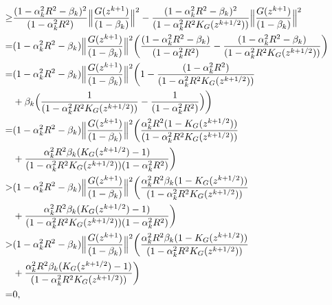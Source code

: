 \documentclass[10pt,a4paper]{amsart}
\begin{document}
\begin{align}
        \geq & \frac{(1 - \alpha_{k}^{2}R^{2} - \beta_{k})^{2}}{(1 - \alpha_{k}^{2}R^{2})}\Big{\|}\frac{G(z^{k+1})}{(1 - \beta_{k})}\Big{\|}^{2} - \frac{(1 - \alpha_{k}^{2}R^{2} - \beta_{k})^{2}}{(1 - \alpha_{k}^{2}R^{2}K_{G}(z^{k+1/2}))}\Big{\|} \frac{G(z^{k+1})}{(1 - \beta_{k})} \Big{\|}^{2} \label{app_of_YE} \\
        =& (1 - \alpha_{k}^{2}R^{2} - \beta_{k})\Big{\|} \frac{G(z^{k+1})}{(1 - \beta_{k})} \Big{\|}^{2}\bigg{(} \frac{(1 - \alpha_{k}^{2}R^{2} - \beta_{k})}{(1 - \alpha_{k}^{2}R^{2})} - \frac{(1 - \alpha_{k}^{2}R^{2} - \beta_{k})}{(1 - \alpha_{k}^{2}R^{2}K_{G}(z^{k+1/2}))} \bigg{)}\label{back_to_funny_alpha_lemma} \\
        =& (1 - \alpha_{k}^{2}R^{2} - \beta_{k})\Big{\|} \frac{G(z^{k+1})}{(1 - \beta_{k})} \Big{\|}^{2} \bigg{(} 1 - \frac{(1 - \alpha_{k}^{2}R^{2})}{(1 - \alpha_{k}^{2}R^{2}K_{G}(z^{k+1/2}))} \notag\\
        &+ \beta_{k} \Big{(}\frac{1}{(1 - \alpha_{k}^{2}R^{2}K_{G}(z^{k+1/2}))} - \frac{1}{(1 - \alpha_{k}^{2}R^{2})} \Big{)}\bigg{)} \notag \\
        =& (1 - \alpha_{k}^{2}R^{2} - \beta_{k})\Big{\|} \frac{G(z^{k+1})}{(1 - \beta_{k})} \Big{\|}^{2} \bigg{(} \frac{\alpha_{k}^{2}R^{2}(1 - K_{G}(z^{k+1/2}))}{(1 - \alpha_{k}^{2}R^{2}K_{G}(z^{k+1/2}))} \notag \\
        &+ \frac{\alpha_{k}^{2}R^{2}\beta_{k}(K_{G}(z^{k+1/2}) - 1)}{(1 - \alpha_{k}^{2}R^{2}K_{G}(z^{k+1/2}))(1 - \alpha_{k}^{2}R^{2})} \bigg{)} \notag \\
        >& (1 - \alpha_{k}^{2}R^{2} - \beta_{k})\Big{\|} \frac{G(z^{k+1})}{(1 - \beta_{k})} \Big{\|}^{2} \bigg{(} \frac{\alpha_{k}^{2}R^{2}\beta_{k}(1 - K_{G}(z^{k+1/2}))}{(1 - \alpha_{k}^{2}R^{2}K_{G}(z^{k+1/2}))} \notag \\
        &+ \frac{\alpha_{k}^{2}R^{2}\beta_{k}(K_{G}(z^{k+1/2}) - 1)}{(1 - \alpha_{k}^{2}R^{2}K_{G}(z^{k+1/2}))(1 - \alpha_{k}^{2}R^{2})} \bigg{)} \label{second_to_last_ineq} \\
        >& (1 - \alpha_{k}^{2}R^{2} - \beta_{k})\Big{\|} \frac{G(z^{k+1})}{(1 - \beta_{k})} \Big{\|}^{2} \bigg{(} \frac{\alpha_{k}^{2}R^{2}\beta_{k}(1 - K_{G}(z^{k+1/2}))}{(1 - \alpha_{k}^{2}R^{2}K_{G}(z^{k+1/2}))} \notag \\
        &+ \frac{\alpha_{k}^{2}R^{2}\beta_{k}(K_{G}(z^{k+1/2}) - 1)}{(1 - \alpha_{k}^{2}R^{2}K_{G}(z^{k+1/2}))} \bigg{)} \label{final_ineq} \\
        =& 0, \notag 
    \end{align}
\end{document}
